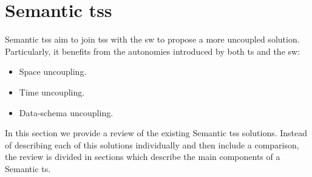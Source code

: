 \section{Semantic \aclp{ts}}
\label{sec:soa_tsc}


Semantic \aclp{ts} aim to join \aclp{ts} with the \acl{sw} to propose a more uncoupled solution.
Particularly, it benefits from the autonomies introduced by both \ac{ts} and the \ac{sw}:

\begin{itemize}
  \item Space uncoupling.
  \item Time uncoupling.
  \item Data-schema uncoupling. %
\end{itemize}


In this section we provide a review of the existing Semantic \aclp{ts} solutions. %
Instead of describing each of this solutions individually and then include a comparison,
the review is divided in sections which describe the main components of a Semantic \ac{ts}.




\newcommand{\midtsc}{\acs{tscm} \citep{fensel_tsc_2007}}
\newcommand{\midsws}{\acs{sws} \citep{tolksdorf_coordination_2006}}
\newcommand{\midstuples}{\acs{stuples} \citep{khushraj_stuples:_2004}}
\newcommand{\midcspaces}{\acs{cspaces} \citep{martinrecuerda_towards_2005}}
\newcommand{\midtscpp}{\acs{tscpp} \citep{krummenacher_open_2009,blunder_distributed_2009}}
\newcommand{\midtripcom}{\acs{tripcom} \citep{simperl_coordination_2007}}
\newcommand{\midsmartmt}{\acs{smartm3} \citep{honkola_smart-m3_2010}}
\newcommand{\midnardini}{\citet{nardini_semantic_2013}}


